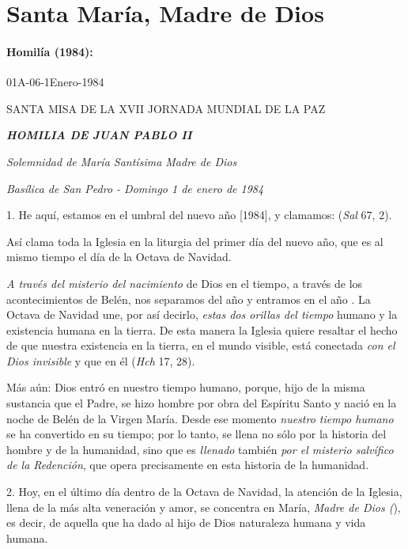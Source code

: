 \begin{body}
\begin{body}
	\end{body}
	
	\chapter{Santa María, Madre de Dios}
	
	\subsubsection{Homilía (1984): } 01A-06-1Enero-1984
	
	SANTA MISA DE LA XVII JORNADA MUNDIAL DE LA PAZ
	
	\emph{\textbf{HOMILIA DE JUAN PABLO II}}
	
	\emph{Solemnidad de María Santísima Madre de Dios}
	
	\emph{Basílica de San Pedro - Domingo 1 de enero de 1984}
	
	1. He aquí, estamos en el umbral del nuevo año {[}1984{]}, y clamamos:  (\emph{Sal} 67, 2).
	
	Así clama toda la Iglesia en la liturgia del primer día del nuevo año, que es al mismo tiempo el día de la Octava de Navidad.
	
	\emph{A través del misterio del nacimiento} de Dios en el tiempo, a través de los acontecimientos de Belén, nos separamos del año  y entramos en el año . La Octava de Navidad une, por así decirlo, \emph{estas dos orillas del tiempo} humano y la existencia humana en la tierra. De esta manera la Iglesia quiere resaltar el hecho de que nuestra existencia en la tierra, en el mundo visible, está conectada \emph{con el Dios invisible} y que en él  (\emph{Hch} 17, 28).
	
	Más aún: Dios entró en nuestro tiempo humano, porque, hijo de la misma sustancia que el Padre, se hizo hombre por obra del Espíritu Santo y nació en la noche de Belén de la Virgen María. Desde ese momento \emph{nuestro tiempo humano} se ha convertido en su tiempo; por lo tanto, se llena no sólo por la historia del hombre y de la humanidad, sino que es \emph{llenado} también \emph{por el misterio salvífico de la 	Redención}, que opera precisamente en esta historia de la humanidad.
	
	2. Hoy, en el último día dentro de la Octava de Navidad, la atención de la Iglesia, llena de la más alta veneración y amor, se concentra en María, \emph{Madre de Dios (}), es decir, de aquella que ha dado al hijo de Dios naturaleza humana y vida humana.
	

\end{body}
